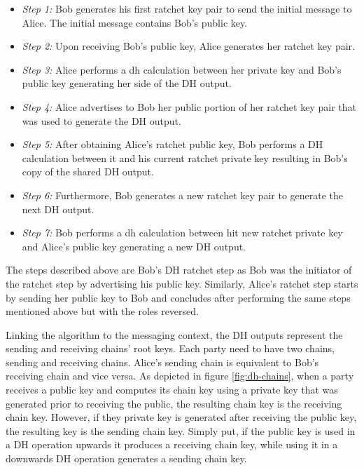 \begin{itemize}
	\item \textit{Step 1:} Bob generates his first ratchet key pair to send the initial message to Alice. The initial message contains Bob's public key. 
	
	\item \textit{Step 2:} Upon receiving Bob's public key, Alice generates her ratchet key pair.
	
	\item \textit{Step 3:} Alice performs a \gls{dh} calculation between her private key and Bob's public key generating her side of the DH output.
	
	\item \textit{Step 4:} Alice advertises to Bob her public portion of her ratchet key pair that was used to generate the DH output.
	
	\item \textit{Step 5:} After obtaining Alice's ratchet public key, Bob performs a DH calculation between it and his current ratchet private key resulting in Bob's copy of the shared DH output.
	
	\item \textit{Step 6:} Furthermore, Bob generates a new ratchet key pair to generate the next DH output.
	
	\item \textit{Step 7:} Bob performs a \gls{dh} calculation between hit new ratchet private key and Alice's public key generating a new DH output.
\end{itemize}
The steps described above are Bob's DH ratchet step as Bob was the initiator of the ratchet step by advertising his public key. Similarly, Alice's ratchet step starts by sending her public key to Bob and concludes after performing the same steps mentioned above but with the roles reversed.
\par
Linking the algorithm to the messaging context, the DH outputs represent the sending and receiving chains' root keys. 
Each party need to have two chains, sending and receiving chains. Alice's sending chain is equivalent to Bob's receiving chain and vice versa. As depicted in figure \ref{fig:dh-chains}, when a party receives a public key and computes its chain key using a private key that was generated prior to receiving the public, the resulting chain key is the receiving chain key. However, if they private key is generated after receiving the public key, the resulting key is the sending chain key. Simply put, if the public key is used in a DH operation upwards it produces a receiving chain key, while using it in a downwards DH operation generates a sending chain key.
